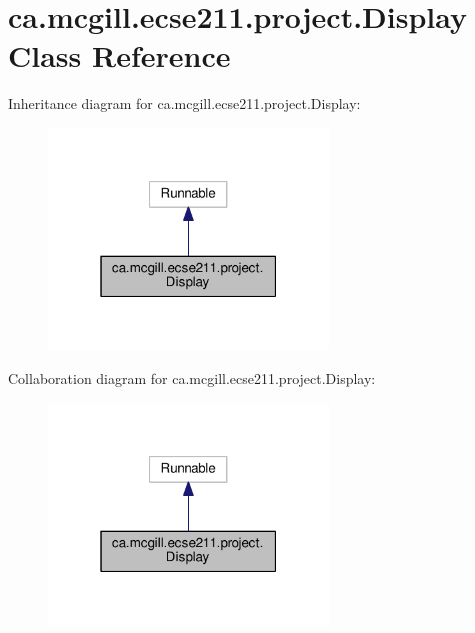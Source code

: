 \hypertarget{classca_1_1mcgill_1_1ecse211_1_1project_1_1_display}{}\section{ca.\+mcgill.\+ecse211.\+project.\+Display Class Reference}
\label{classca_1_1mcgill_1_1ecse211_1_1project_1_1_display}


Inheritance diagram for ca.\+mcgill.\+ecse211.\+project.\+Display\+:
\nopagebreak
\begin{figure}[H]
\begin{center}
\leavevmode
\includegraphics[width=211pt]{classca_1_1mcgill_1_1ecse211_1_1project_1_1_display__inherit__graph}
\end{center}
\end{figure}


Collaboration diagram for ca.\+mcgill.\+ecse211.\+project.\+Display\+:
\nopagebreak
\begin{figure}[H]
\begin{center}
\leavevmode
\includegraphics[width=211pt]{classca_1_1mcgill_1_1ecse211_1_1project_1_1_display__coll__graph}
\end{center}
\end{figure}
